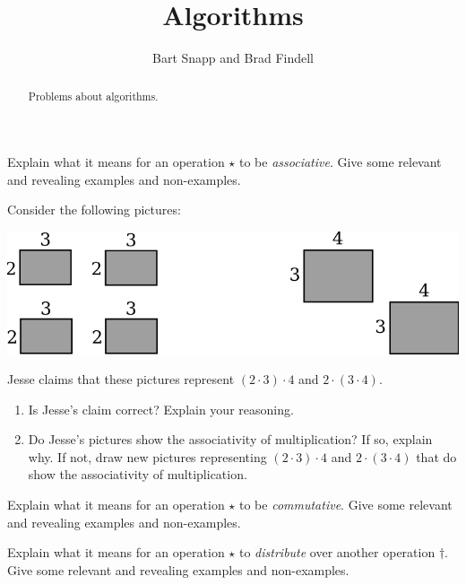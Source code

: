 \documentclass[nooutcomes]{ximera}
\title{Algorithms}
\author{Bart Snapp and Brad Findell}
\begin{document}
\begin{abstract}
Problems about algorithms. 
\end{abstract}
\maketitle



\begin{problem}Explain what it means for an operation $\star$ to be
  \textit{associative}. Give some relevant and revealing examples and non-examples.
\end{problem} 

\begin{problem}\label{P:MA}Consider the following pictures:
\begin{image}
\includegraphics{assMult.png}
\end{image}
Jesse claims that these pictures represent $(2\cdot 3)\cdot 4$ and
$2\cdot (3\cdot 4)$.
\begin{enumerate}
\item Is Jesse's claim correct? Explain your reasoning.
\item Do Jesse's pictures show the associativity of multiplication? If
  so, explain why. If not, draw new pictures representing $(2\cdot
  3)\cdot 4$ and $2\cdot (3\cdot 4)$ that do show the associativity
  of multiplication.
\end{enumerate}
\end{problem} 

\begin{problem}Explain what it means for an operation $\star$ to be
  \textit{commutative}. Give some relevant and revealing examples  and non-examples.
\end{problem} 

\begin{problem}Explain what it means for an operation $\star$ to \textit{distribute}
  over another operation $\dagger$. Give some relevant and revealing
  examples and non-examples.
\end{problem} 
\end{document}
